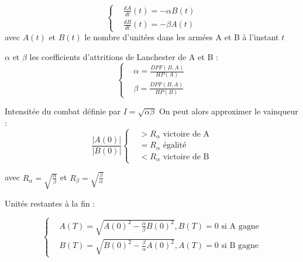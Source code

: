\documentclass[french]{beamer}
\begin{document}
\begin{frame}[plain]
\begin{minipage}{0.49\textwidth}
	\tiny
	\begin{equation*}
		\left\{
		\begin{aligned}
			&\frac{dA}{dt}(t) =-\alpha B(t)\\
			&\frac{dB}{dt}(t) =-\beta A(t)
		\end{aligned}
		\right.
	\end{equation*}
	avec $A(t)$ et $B(t)$ le nombre d'unitées dans les armées A et B à l'instant $t$
	
	$\alpha$ et $\beta$ les coefficients d'attritions de Lanchester de A et B :
	\begin{equation*}
		\left\{
		\begin{aligned}
			&\alpha = \frac{DPF(B,A)}{HP(A)}\\
			&\beta = \frac{DPF(B,A)}{HP(B)}
		\end{aligned}
		\right.
	\end{equation*}
	
	Intensitée du combat définie par $I=\sqrt{\alpha\beta}$
	On peut alors approximer le vainqueur :
	\begin{equation*}
		\frac{|A(0)|}{|B(0)|}
		\left\{
		\begin{aligned}
			&> R_\alpha \text{ victoire de A}\\
			&= R_\alpha \text{ égalité}\\
			&< R_\alpha \text{ victoire de B}
		\end{aligned}
		\right.
	\end{equation*}
\end{minipage}
\begin{minipage}{0.49\textwidth}
avec
$R_\alpha = \sqrt{\frac\alpha\beta}$ et 
$R_\beta = \sqrt{\frac\beta\alpha}$

Unités restantes à la fin : 

\begin{equation*}
	\left\{
	\begin{aligned}
		&A(T) = \sqrt{A(0)^2-\frac\alpha\beta B(0)^2}, B(T)=0\text{ si A gagne}\\
		&B(T) = \sqrt{B(0)^2-\frac\beta\alpha A(0)^2}, A(T)=0\text{ si B gagne}
	\end{aligned}
	\right.
\end{equation*}
\end{minipage}
\end{frame}
\end{document}
